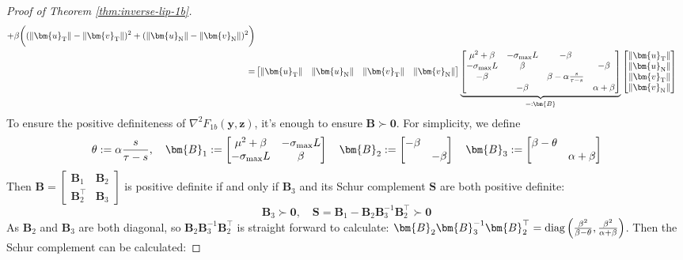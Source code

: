 \documentclass{amsart} %
\def\vzero{{\bm{0}}}
\def\vu{{\bm{u}}}
\def\vv{{\bm{v}}}
\def\vy{{\bm{y}}}
\def\vz{{\bm{z}}}
\def\mB{{\bm{B}}}
\def\mS{{\bm{S}}}
\theoremstyle{definition}
\theoremstyle{remark}
\begin{document}
\begin{proof}[Proof of Theorem \ref{thm:inverse-lip-1b}]
\begin{align*}
+ \beta \bigg( ( \|\vu_{\mathrm{T}}\| - \|\vv_{\mathrm{T}}\| )^2 + ( \|\vu_{\mathrm{N}}\| - \| \vv_{\mathrm{N}}\| )^2 \bigg) \\
= & \begin{bmatrix}
\|\vu_{\mathrm{T}}\| & \|\vu_{\mathrm{N}}\| & \|\vv_{\mathrm{T}}\| & \|\vv_{\mathrm{N}}\|
\end{bmatrix}
\underbrace{\begin{bmatrix}
\mu^2 + \beta & - \sigma_{\textup{max}} L & - \beta & \\
- \sigma_{\textup{max}} L & \beta & & -\beta \\
-\beta & & \beta - \alpha \frac{s}{\tau-s} & \\
& - \beta & & \alpha + \beta 
\end{bmatrix}}_{=:\mB}
\begin{bmatrix}
\|\vu_{\mathrm{T}}\| \\ \|\vu_{\mathrm{N}}\| \\ \|\vv_{\mathrm{T}}\| \\ \|\vv_{\mathrm{N}}\|
\end{bmatrix}
\end{align*}
To ensure the positive definiteness of $\nabla^2F_{1b}(\vy,\vz)$, it's enough to ensure $\mB \succ \vzero$. For simplicity, we define
\[
\theta := \alpha \frac{s}{\tau-s}, \quad 
\mB_{1}:= \begin{bmatrix}
\mu^2 + \beta & - \sigma_{\textup{max}} L \\
- \sigma_{\textup{max}} L & \beta 
\end{bmatrix}
\quad \mB_{2}:= \begin{bmatrix}
 - \beta & \\
 & -\beta 
\end{bmatrix}
\quad \mB_{3}:= \begin{bmatrix}
 \beta - \theta & \\
 & \alpha + \beta 
\end{bmatrix}\]
Then $\mB = \begin{bmatrix}
\mB_1 & \mB_2 \\ 
\mB_2^\top & \mB_3
\end{bmatrix}$ is positive definite if and only if $\mB_3$ and its Schur complement $\mS$ are both positive definite:
\[ \mB_3 \succ \vzero ,\quad \mS = \mB_1 - \mB_2 \mB_3^{-1} \mB_2^\top \succ \vzero\] 
As $\mB_2$ and $\mB_3$ are both diagonal, so $\mB_2 \mB_3^{-1} \mB_2^\top$ is straight forward to calculate: $\mB_2 \mB_3^{-1} \mB_2^\top = \textup{diag}\left(\frac{\beta^2}{\beta-\theta}, \frac{\beta^2}{\alpha+\beta}\right)$. Then the Schur complement can be calculated:

\end{proof}
\end{document}
